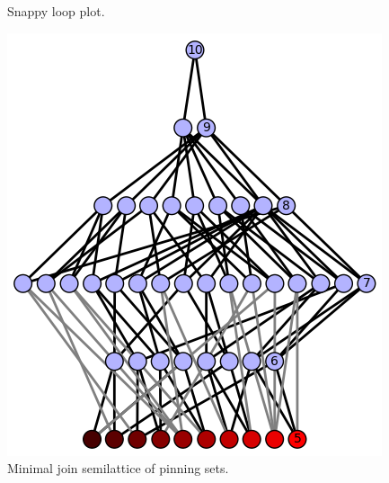 \documentclass{article}%
\begin{document}
\begin{multicols}{2}
\begin{figure}[H]
\centering
\def\svgscale{0.7}

\caption{Snappy loop plot.}
\label{fig:tex/img/[(1, 7, 2, 6), (3, 8, 4, 9), (5, 11, 6, 10), (16, 12, 1, 11), (2, 13, 3, 14), (4, 16, 5, 15), (7, 12, 8, 13), (9, 15, 10, 14)].svg}
\end{figure}
\columnbreak

\begin{figure}[H]
\centering
\includegraphics[scale=.9]{tex/img/[(1, 7, 2, 6), (3, 8, 4, 9), (5, 11, 6, 10), (16, 12, 1, 11), (2, 13, 3, 14), (4, 16, 5, 15), (7, 12, 8, 13), (9, 15, 10, 14)].png}
\caption{Minimal join semilattice of pinning sets.}
\label{fig:tex/img/[(1, 7, 2, 6), (3, 8, 4, 9), (5, 11, 6, 10), (16, 12, 1, 11), (2, 13, 3, 14), (4, 16, 5, 15), (7, 12, 8, 13), (9, 15, 10, 14)].png}
\end{figure}
\end{multicols}

\newpage
\end{document}
